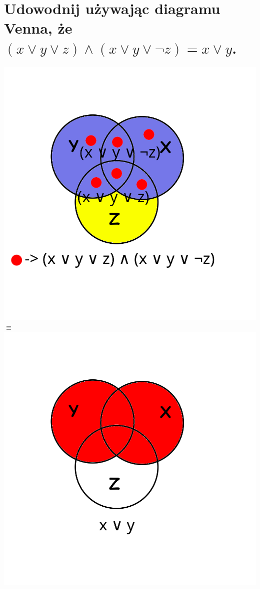 \documentclass{article}
\begin{document}
\section{Udowodnij używając diagramu Venna, że $(x \vee y \vee z) \wedge (x \vee y \vee \neg z) = x \vee y$.}
\begin{center}
	\includegraphics[scale=0.4]{./L01Z03czI.png} $\equiv$ \includegraphics[scale=0.4]{./L01Z03czII.png}\\
\end{center}
\end{document}
